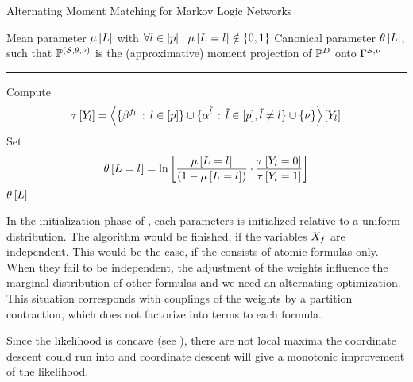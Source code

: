 \begin{algorithm}[hbt!]
    \caption{Alternating Moment Matching for Markov Logic Networks}\label{alg:AMM_MLN}
    \begin{algorithmic}
        \Require Mean parameter $\mu\left[L\right]$ with $\forall{l\in[p]}:{\mu\left[L_{}=l_{}\right]\notin\{0,1\}}$
        \Ensure Canonical parameter $\theta\left[L\right]$, such that $\mathbb{P}^{(\mathcal{S},\theta,\nu)}$ is the (approximative) moment projection of $\mathbb{P}^{D}$ onto $\Gamma^{\mathcal{S},\nu}$
        \hrule
            \For{$\selindex\in\secnodes$}
                \State Compute
                \begin{align*}
                    \tau\left[Y_{l}\right]
                    = \left\langle \{\beta^{f_{l}} \, : \, l\in[p]\}
                    \cup\{\alpha^{\tilde{l}} \,:\, \tilde{l} \in [p], \tilde{l}\neq l\}
                    \cup\{\nu\}\right\rangle \left[ Y_{l} \right]
                \end{align*}
                \State Set
                \begin{align*}
                    \theta\left[L_{}=l_{}\right] = \ln \left[ 
                        \frac{\mu\left[L_{}=l_{}\right]}{(1-\mu\left[L_{}=l_{}\right])}
                        \cdot \frac{\tau\left[Y_{l}=0\right]}{\tau\left[Y_{l}=1\right]}
                     \right]
                \end{align*}
            \EndFor
        \EndWhile
        \State \Return $\theta\left[L\right]$
    \end{algorithmic}
\end{algorithm}

In the initialization phase of , each parameters is initialized relative to a uniform distribution.
The algorithm would be finished, if the variables $X_{f}$ are independent.
This would be the case, if the \MarkovLogicNetwork{} consists of atomic formulas only.
When they fail to be independent, the adjustment of the weights influence the marginal distribution of other formulas and we need an alternating optimization.
%
This situation corresponds with couplings of the weights by a partition contraction, which does not factorize into terms to each formula.

Since the likelihood is concave (see \cite{koller_probabilistic_2009}), there are not local maxima the coordinate descent could run into and coordinate descent will give a monotonic improvement of the likelihood.

